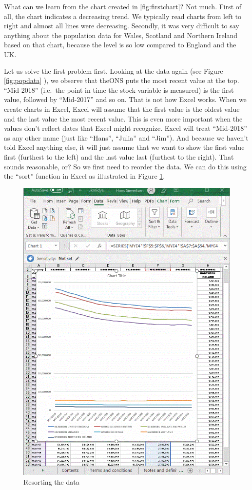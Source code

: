 \documentclass[]{book}
\begin{document}
What can we learn from the chart created in \ref{fig:firstchart}? Not much. First of all, the chart indicates a decreasing trend. We typically read charts from left to right and almost all lines were decreasing. Secondly, it was very difficult to say anything about the population data for Wales, Scotland and Northern Ireland based on that chart, because the level is so low compared to England and the UK.

Let us solve the first problem first. Looking at the data again (see Figure \ref{fig:popdata} ), we observe that theONS puts the most recent value at the top. ``Mid-2018'' (i.e.~the point in time the stock variable is measured) is the first value, followed by ``Mid-2017'' and so on. That is not how Excel works. When we create charts in Excel, Excel will assume that the first value is the oldest value and the last value the most recent value. This is even more important when the values don't reflect dates that Excel might recognize. Excel will treat ``Mid-2018'' as any other name (just like ``Hans'', ``Julia'' and ``Jim''). And because we haven't told Excel anything else, it will just assume that we want to show the first value first (furthest to the left) and the last value last (furthest to the right). That sounds reasonable, or? So we first need to reorder the data. We can do this using the ``sort'' function in Excel as illustrated in Figure \ref{fig:sorted}.

\begin{figure}

{\centering \includegraphics[width=0.7\linewidth]{_resources/chapter_people/sorted} 

}

\caption{Resorting the data}\label{fig:sorted}
\end{figure}
\end{document}
